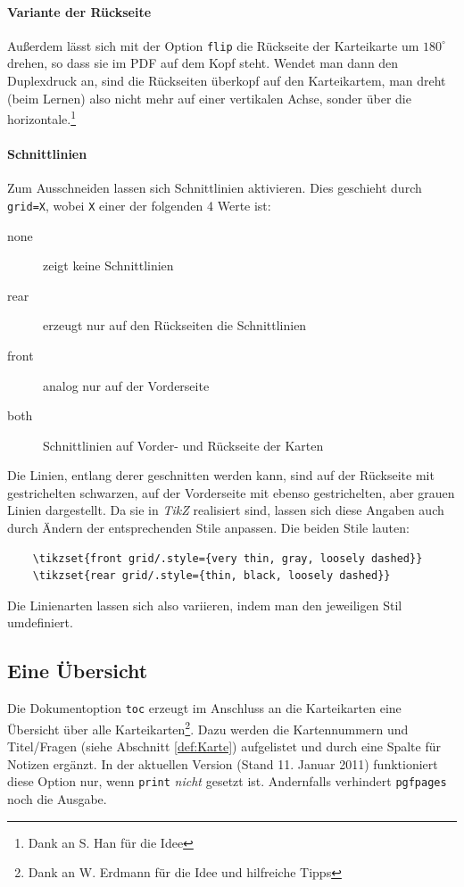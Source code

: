 \documentclass[a4paper,DIV=calc]{scrartcl}
\newcommand{\befehl}[1]{%
\marginpar{\footnotesize\textsf{#1}}%
}
\begin{document}
\paragraph{Variante der Rückseite}
Außerdem lässt sich mit der Option \befehl{flip}\lstinline!flip! die Rückseite der Karteikarte um $180^{\circ}$ drehen, so dass sie im PDF auf dem Kopf steht. Wendet man dann den Duplexdruck an, sind die Rückseiten überkopf auf den Karteikartem, man dreht (beim Lernen) also nicht mehr auf einer vertikalen Achse, sonder über die horizontale.\footnote{Dank an S. Han für die Idee}

\paragraph{Schnittlinien}
Zum Ausschneiden lassen sich Schnittlinien aktivieren. Dies geschieht durch \befehl{grid=X} \lstinline!grid=X!, wobei \lstinline!X! einer der folgenden 4 Werte ist:
\begin{description}
	\item[none] zeigt keine Schnittlinien
	\item[rear] erzeugt nur auf den Rückseiten die Schnittlinien
	\item[front] analog nur auf der Vorderseite
	\item[both] Schnittlinien auf Vorder- und Rückseite der Karten	
\end{description}
Die Linien, entlang derer geschnitten werden kann, sind auf der Rückseite mit gestrichelten schwarzen, auf der Vorderseite mit ebenso gestrichelten, aber grauen Linien dargestellt. Da sie in \emph{TikZ} realisiert sind, lassen sich diese Angaben auch durch Ändern der entsprechenden Stile anpassen. Die beiden Stile lauten:
\begin{lstlisting}
	\tikzset{front grid/.style={very thin, gray, loosely dashed}}
	\tikzset{rear grid/.style={thin, black, loosely dashed}}
\end{lstlisting}
Die Linienarten lassen sich also variieren, indem man den jeweiligen Stil umdefiniert.
\subsection{Eine Übersicht}
Die Dokumentoption \befehl{toc}\lstinline!toc! erzeugt im Anschluss an die Karteikarten eine Übersicht über alle Karteikarten\footnote{Dank an W. Erdmann für die Idee und hilfreiche Tipps}. Dazu werden die Kartennummern und Titel/Fragen (siehe Abschnitt \ref{def:Karte}) aufgelistet und durch eine Spalte für Notizen ergänzt. In der aktuellen Version (Stand 11. Januar 2011) funktioniert diese Option nur, wenn \lstinline!print! \emph{nicht} gesetzt ist. Andernfalls verhindert \lstinline!pgfpages! noch die Ausgabe.
\end{document}
